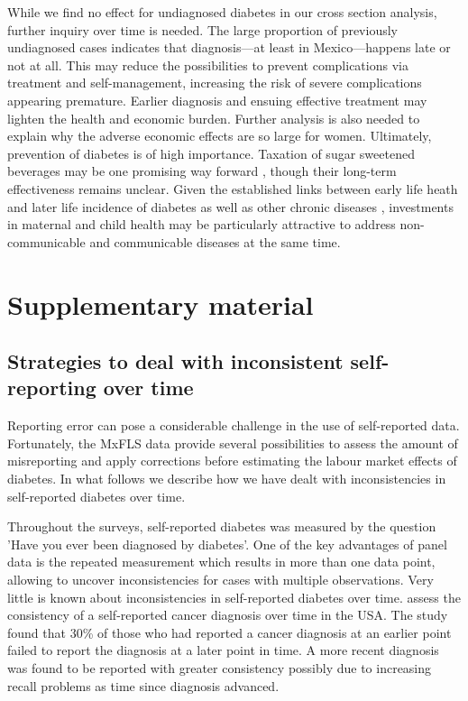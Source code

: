 \documentclass[12pt,english]{article}
\begin{document}
While we find no effect for undiagnosed diabetes in our cross section analysis, further inquiry over time is needed. The large proportion of previously undiagnosed cases indicates that diagnosis—at least in Mexico—happens late or not at all. This may reduce the possibilities to prevent complications via treatment and self-management, increasing the risk of severe complications appearing premature. Earlier diagnosis and ensuing effective treatment may lighten the health and economic burden. Further analysis is also needed to explain why the adverse economic effects are so large for women. Ultimately, prevention of diabetes is of high importance. Taxation of sugar sweetened beverages may be one promising way forward \parencite{Colchero2016}, though their long-term effectiveness remains unclear. Given the established links between early life heath and later life incidence of diabetes as well as other chronic diseases \parencite{Sotomayor2013,Hanson2012,Li2010b}, investments in maternal and child health may be particularly attractive to address non-communicable and communicable diseases at the same time.

\printbibliography


	
\clearpage
\setcounter{table}{0}
\renewcommand{\thetable}{S\arabic{table}}
\setcounter{figure}{0}
\setcounter{page}{1}
\renewcommand{\thefigure}{S\arabic{figure}} %
\section*{Supplementary material}

\subsection*{\label{sec:Appendix}Strategies to deal with inconsistent self-reporting over time}

Reporting error can pose a considerable challenge in the use of self-reported data. Fortunately, the \ac{MxFLS} data provide several possibilities to assess the amount of misreporting and apply corrections before estimating the labour market effects of diabetes. In what follows we describe how we have dealt with inconsistencies in self-reported diabetes over time.

Throughout the surveys, self-reported diabetes was measured by the question 'Have you ever been diagnosed by diabetes'. One of the key advantages of panel data is the repeated measurement which results in more than one data point, allowing to uncover inconsistencies for cases with multiple observations. Very little is known about inconsistencies in self-reported diabetes over time. \textcite{Zajacova2010} assess the consistency of a self-reported cancer diagnosis over time in the USA. The study found that 30\% of those who had reported a cancer diagnosis at an earlier point failed to report the diagnosis at a later point in time. A more recent diagnosis was found to be reported with greater consistency possibly due to increasing recall problems as time since diagnosis advanced.
\end{document}

